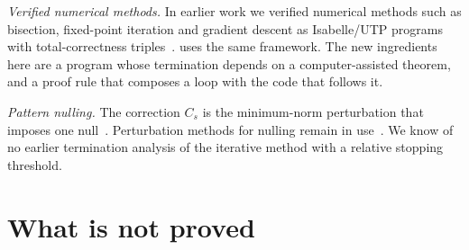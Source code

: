 \documentclass[11pt]{amsart}
\theoremstyle{plain}
\theoremstyle{definition}
\begin{document}
\emph{Verified numerical methods.}  In earlier work we verified numerical methods such as bisection,
fixed-point iteration and gradient descent as Isabelle/UTP programs with total-correctness
triples~\cite{BryantHF26}.   uses the same framework.  The new ingredients here are a
program whose termination depends on a computer-assisted theorem, and a proof rule that composes a
loop with the code that follows it.

\emph{Pattern nulling.}  The correction $C_s$ is the minimum-norm perturbation that imposes one
null~\cite{Steyskal1982}.  Perturbation methods for nulling remain in use~\cite{Gong2024}.  We know of no
earlier termination analysis of the iterative method with a relative stopping threshold.

\section{What is not proved}\label{sec:limits}
\end{document}
